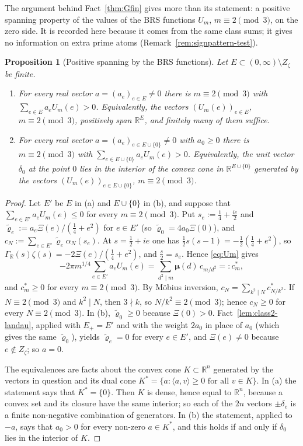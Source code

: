 \documentclass[11pt]{amsart}
\newcommand{\RR}{\mathbb R}
\newcommand{\GR}{\Gamma_{\mathbb R}}
\newcommand{\Zz}{Z_\zeta}
\newtheorem{proposition}[theorem]{Proposition}
\theoremstyle{definition}
\theoremstyle{remark}
\numberwithin{equation}{section}
\begin{document}
The argument behind Fact~\ref{thm:Gfin} gives more than its statement: a positive spanning property of the values of the BRS
functions $U_m$, $m\equiv2\pmod3$, on the zero side. It is recorded here because it comes from the same class sums; it gives
no information on extra prime atoms (Remark~\ref{rem:signpattern-test}).

\begin{proposition}[Positive spanning by the BRS functions]\label{prop:signpattern}
Let $E\subset(0,\infty)\setminus\Zz$ be finite.
\begin{enumerate}[label=\textup{(\alph*)}]
\item For every real vector $a=(a_e)_{e\in E}\ne0$ there is $m\equiv2\pmod3$ with $\sum_{e\in E}a_eU_m(e)>0$. Equivalently, the vectors
$(U_m(e))_{e\in E}$, $m\equiv2\pmod3$, positively span $\RR^E$, and finitely many of them suffice.
\item For every real vector $a=(a_e)_{e\in E\cup\{0\}}\ne0$ with $a_0\ge0$ there is $m\equiv2\pmod3$ with $\sum_{e\in E\cup\{0\}}a_eU_m(e)>0$.
Equivalently, the unit vector $\delta_0$ at the point $0$ lies in the interior of the convex cone in $\RR^{E\cup\{0\}}$ generated by the
vectors $(U_m(e))_{e\in E\cup\{0\}}$, $m\equiv2\pmod3$.
\end{enumerate}
\end{proposition}

\begin{proof}
Let $E'$ be $E$ in (a) and $E\cup\{0\}$ in (b), and suppose that $\sum_{e\in E'}a_eU_m(e)\le0$ for every $m\equiv2\pmod3$. Put
$s_e:=\frac14+\frac{ie}2$ and $\tilde\varrho_e:=a_e\Xi(e)/(\frac14+e^2)$ for $e\in E'$ (so $\tilde\varrho_0=4a_0\Xi(0)$), and
$c_N:=\sum_{e\in E'}\tilde\varrho_e\alpha_N(s_e)$. At $s=\frac12+ie$ one has $\frac12s(s-1)=-\frac12(\frac14+e^2)$, so
$\GR(s)\zeta(s)=-2\Xi(e)/(\frac14+e^2)$, and $\frac s2=s_e$. Hence \eqref{eq:Um} gives
\[
-2\pi m^{1/4}\sum_{e\in E'}a_eU_m(e)=\sum_{d^2\mid m}\boldsymbol\mu(d)\,c_{m/d^2}=:c^*_m,
\]
and $c^*_m\ge0$ for every $m\equiv2\pmod3$. By M\"obius inversion, $c_N=\sum_{k^2\mid N}c^*_{N/k^2}$. If $N\equiv2\pmod3$ and $k^2\mid N$, then
$3\nmid k$, so $N/k^2\equiv2\pmod3$; hence $c_N\ge0$ for every $N\equiv2\pmod3$. In (b), $\tilde\varrho_0\ge0$ because $\Xi(0)>0$.
Fact~\ref{lem:class2-landau}, applied with $E_+=E'$ and with the weight $2a_0$ in place of $a_0$ (which gives the same $\tilde\varrho_0$), yields
$\tilde\varrho_e=0$ for every $e\in E'$, and $\Xi(e)\ne0$ because $e\notin\Zz$; so $a=0$.

The equivalences are facts about the convex cone $K\subset\RR^n$ generated by the vectors in question and its dual cone
$K^*=\{a:\langle a,v\rangle\ge0\text{ for all }v\in K\}$. In (a) the statement says that $K^*=\{0\}$. Then $K$ is dense, hence equal to $\RR^n$,
because a convex set and its closure have the same interior; so each of the $2n$ vectors $\pm\delta_e$ is a finite non-negative
combination of generators. In (b) the statement, applied to $-a$, says that $a_0>0$ for every non-zero $a\in K^*$, and this holds if and only
if $\delta_0$ lies in the interior of $K$.
\end{proof}
\end{document}
